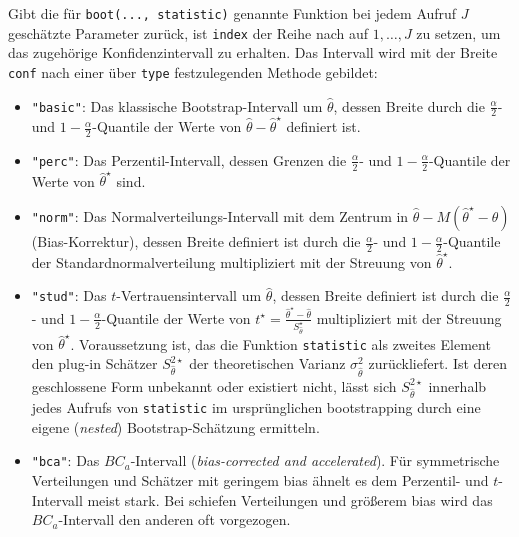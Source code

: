 Gibt die für \lstinline!boot(..., statistic)! genannte Funktion bei jedem Aufruf $J$ geschätzte Parameter zurück, ist \lstinline!index! der Reihe nach auf $1, \ldots, J$ zu setzen, um das zugehörige Konfidenzintervall zu erhalten. Das Intervall wird mit der Breite \lstinline!conf! nach einer über \lstinline!type! festzulegenden Methode gebildet:
\begin{itemize}
\item \lstinline!"basic"!: Das klassische Bootstrap-Intervall um $\hat{\theta}$, dessen Breite durch die $\frac{\alpha}{2}$- und $1-\frac{\alpha}{2}$-Quantile der Werte von $\hat{\theta} - \hat{\theta}^{\star}$ definiert ist.
\item \lstinline!"perc"!: Das Perzentil-Intervall, dessen Grenzen die $\frac{\alpha}{2}$- und $1-\frac{\alpha}{2}$-Quantile der Werte von $\hat{\theta}^{\star}$ sind.
\item \lstinline!"norm"!: Das Normalverteilungs-Intervall mit dem Zentrum in $\hat{\theta} - M(\hat{\theta}^{\star} - \hat{\theta})$ (Bias-Korrektur), dessen Breite definiert ist durch die $\frac{\alpha}{2}$- und $1-\frac{\alpha}{2}$-Quantile der Standardnormalverteilung multipliziert mit der Streuung von $\hat{\theta}^{\star}$.
\item \lstinline!"stud"!: Das $t$-Vertrauensintervall um $\hat{\theta}$, dessen Breite definiert ist durch die $\frac{\alpha}{2}$- und $1-\frac{\alpha}{2}$-Quantile der Werte von $t^{\star} = \frac{\hat{\theta}^{\star} - \hat{\theta}}{S_{\hat{\theta}}^{\star}}$ multipliziert mit der Streuung von $\hat{\theta}^{\star}$. Voraussetzung ist, das die Funktion \lstinline!statistic! als zweites Element den plug-in Schätzer $S_{\hat{\theta}}^{2 \star}$ der theoretischen Varianz $\sigma_{\hat{\theta}}^{2}$ zurückliefert. Ist deren geschlossene Form unbekannt oder existiert nicht, lässt sich $S_{\hat{\theta}}^{2 \star}$ innerhalb jedes Aufrufs von \lstinline!statistic! im ursprünglichen bootstrapping durch eine eigene (\emph{nested}) Bootstrap-Schätzung ermitteln.
\item \lstinline!"bca"!: Das $BC_{a}$-Intervall (\emph{bias-corrected and accelerated}). Für symmetrische Verteilungen und Schätzer mit geringem bias ähnelt es dem Perzentil- und $t$-Intervall meist stark. Bei schiefen Verteilungen und größerem bias wird das $BC_{a}$-Intervall den anderen oft vorgezogen.
\end{itemize}


